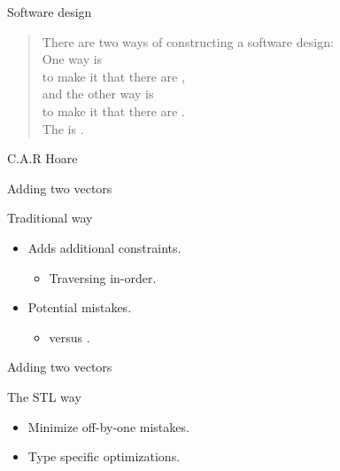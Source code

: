 \begin{frame}[t]{Software design}

\begin{quote}
There are two ways of constructing a software design:\\ 
\vspace{1em}
\pause
One way is\\
\pause
to make it  that there are ,\\
\pause
\vspace{.5em}
and the other way is\\
\pause
to make it  that there are .\\ 
\vspace{1em}
\pause
The  is . 
\end{quote}
\hfill C.A.R Hoare
\end{frame}

\begin{frame}[t,fragile]{Adding two vectors}
\begin{block}{Traditional way}

\end{block}
\pause
\begin{itemize}
  \item Adds additional constraints.
    \begin{itemize}
      \item Traversing in-order.
    \end{itemize}
  \item Potential mistakes.
    \begin{itemize}
      \item {} versus .
    \end{itemize}
\end{itemize}
\end{frame}

\begin{frame}[t,fragile]{Adding two vectors}
\begin{block}{The STL way}

\end{block}
\pause
\begin{itemize}
  \item Minimize off-by-one mistakes.
  \item Type specific optimizations.
\end{itemize}
\end{frame}

